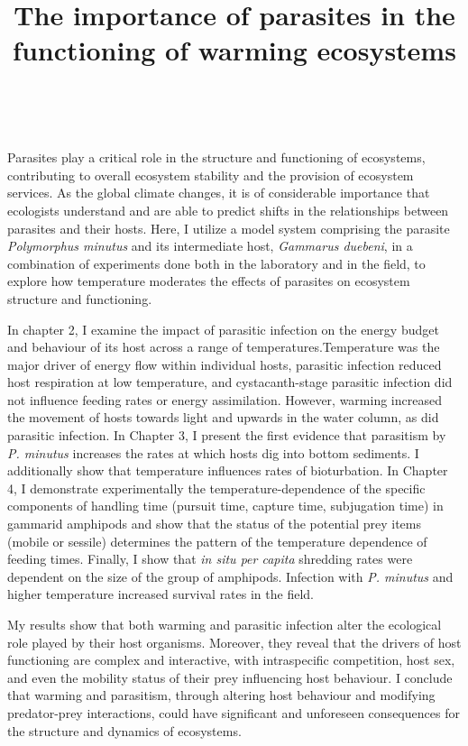 \documentclass[a4paper,11pt]{article}
\date{}
\begin{document}
\begin{center}
\title{The importance of parasites in the functioning of warming ecosystems}
\maketitle
\date{ \vspace{-5ex}}


\\

\end{center}

Parasites play a critical role in the structure and functioning of ecosystems, contributing to overall ecosystem stability and the provision of ecosystem services. As the global climate changes, it is of considerable importance that ecologists understand and are able to predict shifts in the relationships between parasites and their hosts. Here, I utilize a model system comprising the parasite \emph{Polymorphus minutus} and its intermediate host, \emph{Gammarus duebeni}, in a combination of experiments done both in the laboratory and in the field, to explore how temperature moderates the effects of parasites on ecosystem structure and functioning. 

In chapter 2, I examine the impact of parasitic infection on the energy budget and behaviour of its host across a range of temperatures.Temperature was the major driver of energy flow within individual hosts, parasitic infection reduced host respiration at low temperature, and cystacanth-stage parasitic infection did not influence feeding rates or energy assimilation. However, warming increased the movement of hosts towards light and upwards in the water column, as did parasitic infection. In Chapter 3,  I present the first evidence that parasitism by \emph{P. minutus} increases the rates at which hosts dig into bottom sediments. I additionally show that temperature influences rates of bioturbation. In Chapter 4, I demonstrate experimentally the temperature-dependence of the specific components of handling time (pursuit time, capture time, subjugation time) in gammarid amphipods and show that the status of the potential prey items (mobile or sessile) determines the pattern of the temperature dependence of feeding times. Finally, I show that  \emph{in situ per capita} shredding rates were dependent on the size of the group of amphipods. Infection with \emph{P. minutus} and higher temperature increased survival rates in the field. 

My results show that both warming and parasitic infection alter the ecological role played by their host organisms. Moreover, they reveal that the drivers of host functioning are complex and interactive, with intraspecific competition, host sex, and even the mobility status of their prey influencing host behaviour. I conclude that warming and parasitism, through altering host behaviour and modifying predator-prey interactions, could have significant and unforeseen consequences for the structure and dynamics of ecosystems.
\end{document}
